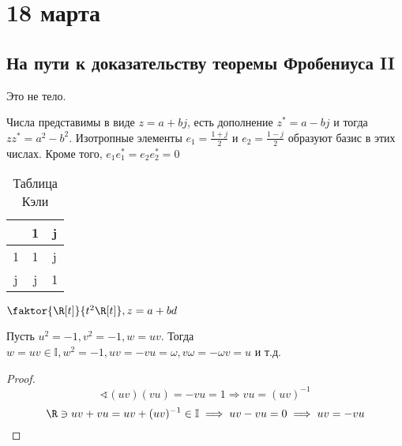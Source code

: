 \chapter{18 марта}

\section{На пути к доказательству теоремы Фробениуса II}

\begin{example}
	Это не тело.

	Числа представимы в виде \(z = a + bj\), есть дополнение \(z^* = a - bj\) и тогда \(zz^* = a^2 - b^2\). Изотропные элементы \(e_1 = \frac{1+j}{2}\) и \(e_2 = \frac{1-j}{2}\) образуют базис в этих числах. Кроме того, \(e_1 e_1^* = e_2 e_2^* = 0\)
	\begin{table}[h]
		\caption{Таблица Кэли}
		\centering
		\begin{tabular}{C|C|C}
			  & 1 & j \\  & 1 & j \\ \hline
			j & j & 1 \\
		\end{tabular}
	\end{table}
\end{example}

\begin{example}
	\(\faktor{\R[t]}{t^2 \R[t]}, z = a + bd\)
\end{example}

\begin{lemma}
	Пусть \(u^2 = - 1, v^2 =- 1, w = uv\). Тогда \(w = uv \in \mathbb{I}, w^2 =- 1, uv = -vu = \omega, v \omega = - \omega v = u\) и т.д.
\end{lemma}
\begin{proof}
	\[\sphericalangle (uv)(vu) = - vu = 1 \Rightarrow vu = (uv)^{-1}\]
	\[\R \ni uv + vu = uv + (uv)^{-1} \in \mathbb{I} \implies uv - vu = 0 \implies uv = -vu\]
\end{proof}


